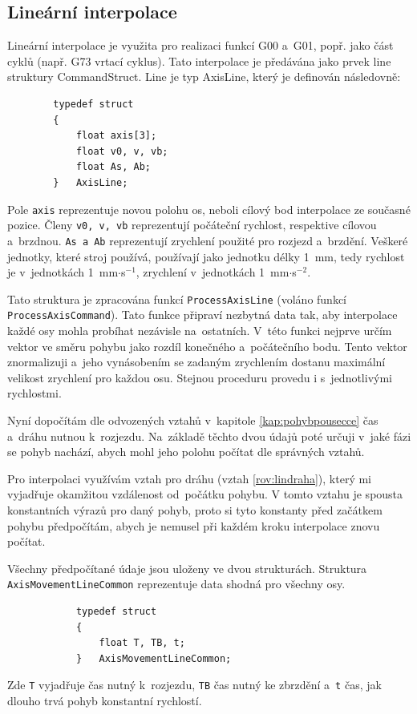 		\subsection{Lineární interpolace}
		Lineární interpolace je využita pro realizaci funkcí G00 a~G01, popř. jako část cyklů (např. G73 vrtací cyklus)\cite{gcode}. Tato interpolace je předávána jako prvek line struktury CommandStruct. Line je typ AxisLine, který je definován následovně:
		\begin{verbatim}
		typedef struct
		{
		    float axis[3];
		    float v0, v, vb;
		    float As, Ab;
		}	AxisLine;
		\end{verbatim}
		Pole {\tt axis} reprezentuje novou polohu os, neboli cílový bod interpolace ze současné pozice. Členy {\tt v0, v, vb} reprezentují počáteční rychlost, respektive cílovou a~brzdnou. {\tt As a~Ab} reprezentují zrychlení použité pro rozjezd a~brzdění. Veškeré jednotky, které stroj používá, používají jako jednotku délky 1~mm, tedy rychlost je v~jednotkách 1~mm$\cdot$s$^{-1}$, zrychlení v~jednotkách 1~mm$\cdot$s$^{-2}$.
		
		Tato struktura je zpracována funkcí {\tt ProcessAxisLine} (voláno funkcí {\tt ProcessAxisCommand}). Tato funkce připraví nezbytná data tak, aby interpolace každé osy mohla probíhat nezávisle na~ostatních. V~této funkci nejprve určím vektor ve směru pohybu jako rozdíl konečného a~počátečního bodu. Tento vektor znormalizuji a~jeho vynásobením se zadaným zrychlením dostanu maximální velikost zrychlení pro každou osu. Stejnou proceduru provedu i s~jednotlivými rychlostmi.
		
		Nyní dopočítám dle odvozených vztahů v~kapitole \ref{kap:pohybpousecce} čas a~dráhu nutnou k~rozjezdu. Na~základě těchto dvou údajů poté určuji v~jaké fázi se pohyb nachází, abych mohl jeho polohu počítat dle správných vztahů.
		
		Pro interpolaci využívám vztah pro dráhu (vztah \ref{rov:lindraha}), který mi vyjadřuje okamžitou vzdálenost od~počátku pohybu. V tomto vztahu je spousta konstantních výrazů pro daný pohyb, proto si tyto konstanty před začátkem pohybu předpočítám, abych je nemusel při každém kroku interpolace znovu počítat.
		
		Všechny předpočítané údaje jsou uloženy ve dvou strukturách. Struktura {\tt AxisMovementLineCommon} reprezentuje data shodná pro všechny osy.
		\begin{verbatim}
			typedef struct
			{
			    float T, TB, t;
			}	AxisMovementLineCommon;
		\end{verbatim}
		Zde {\tt T} vyjadřuje čas nutný k~rozjezdu, {\tt TB} čas nutný ke zbrzdění a~{\tt t} čas, jak dlouho trvá pohyb konstantní rychlostí.
		
